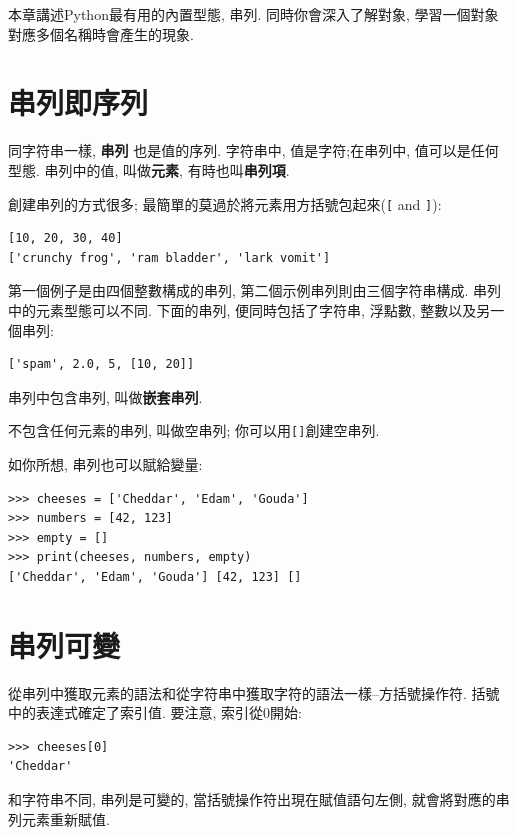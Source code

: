 \documentclass[10pt]{book}
\begin{document}
本章講述Python最有用的內置型態, 串列. 
同時你會深入了解對象, 學習一個對象對應多個名稱時會產生的現象. 


\section{串列即序列}
\label{sequence}

同字符串一樣, {\bf 串列} 也是值的序列. 
字符串中, 值是字符;在串列中, 值可以是任何型態. 
串列中的值, 叫做{\bf 元素}, 有時也叫{\bf 串列項}.

創建串列的方式很多; 最簡單的莫過於將元素用方括號包起來(\verb"[" and \verb"]"):

\begin{verbatim}
[10, 20, 30, 40]
['crunchy frog', 'ram bladder', 'lark vomit']
\end{verbatim}
%
第一個例子是由四個整數構成的串列, 
第二個示例串列則由三個字符串構成. 
串列中的元素型態可以不同. 
下面的串列, 便同時包括了字符串, 浮點數, 整數以及另一個串列:

\begin{verbatim}
['spam', 2.0, 5, [10, 20]]
\end{verbatim}
%
串列中包含串列, 叫做{\bf 嵌套串列}.

不包含任何元素的串列, 叫做空串列;
你可以用\verb"[]"創建空串列.

如你所想, 串列也可以賦給變量:

\begin{verbatim}
>>> cheeses = ['Cheddar', 'Edam', 'Gouda']
>>> numbers = [42, 123]
>>> empty = []
>>> print(cheeses, numbers, empty)
['Cheddar', 'Edam', 'Gouda'] [42, 123] []
\end{verbatim}
%


\section{串列可變}
\label{mutable}

從串列中獲取元素的語法和從字符串中獲取字符的語法一樣--方括號操作符. 
括號中的表達式確定了索引值. 
要注意, 索引從0開始:

\begin{verbatim}
>>> cheeses[0]
'Cheddar'
\end{verbatim}
%
和字符串不同, 串列是可變的, 當括號操作符出現在賦值語句左側, 
就會將對應的串列元素重新賦值. 
\end{document}
